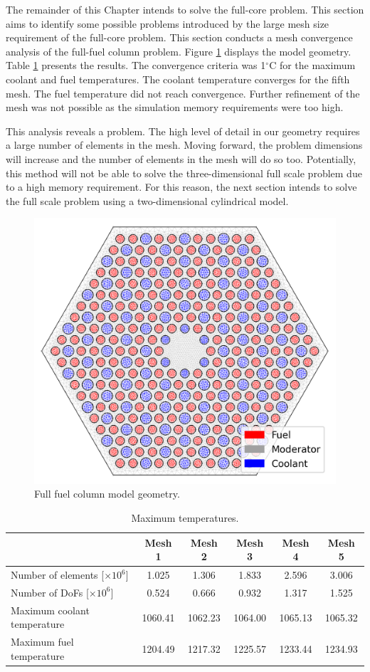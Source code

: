 The remainder of this Chapter intends to solve the full-core problem.
This section aims to identify some possible problems introduced by the large mesh size requirement of the full-core problem.
This section conducts a mesh convergence analysis of the full-fuel column problem.
Figure \ref{fig:th-full-assem-mesh} displays the model geometry.
Table \ref{tab:th-full-assem-results} presents the results.
The convergence criteria was 1$^{\circ}$C for the maximum coolant and fuel temperatures.
The coolant temperature converges for the fifth mesh.
The fuel temperature did not reach convergence.
Further refinement of the mesh was not possible as the simulation memory requirements were too high.

This analysis reveals a problem.
The high level of detail in our geometry requires a large number of elements in the mesh.
Moving forward, the problem dimensions will increase and the number of elements in the mesh will do so too.
Potentially, this method will not be able to solve the three-dimensional full scale problem due to a high memory requirement.
For this reason, the next section intends to solve the full scale problem using a two-dimensional cylindrical model.

\begin{figure}[htbp!]
  \centering
  \includegraphics[width=0.45\linewidth]{figures-thermal/full-assem-mesh2}
  \hfill
  \caption{Full fuel column model geometry.}
  \label{fig:th-full-assem-mesh}
\end{figure}

\begin{table}[htbp!]
  \centering
  \caption{Maximum temperatures.}
  \label{tab:th-full-assem-results}
\begin{tabular}{l|ccccc}
\toprule
                            & Mesh 1 & Mesh 2 & Mesh 3 & Mesh 4 & Mesh 5 \\
\midrule
Number of elements [$\times 10^{6}$]  & 1.025 & 1.306 & 1.833 & 2.596 & 3.006 \\
Number of DoFs [$\times 10^{6}$]      & 0.524 & 0.666 & 0.932 & 1.317 & 1.525 \\
Maximum coolant temperature & 1060.41 & 1062.23 & 1064.00 & 1065.13 & 1065.32 \\
Maximum fuel temperature    & 1204.49 & 1217.32 & 1225.57 & 1233.44 & 1234.93 \\
\bottomrule
\end{tabular}
\end{table}

